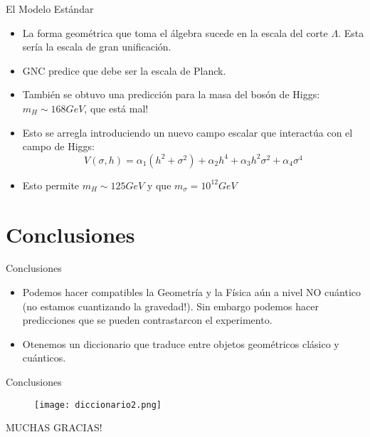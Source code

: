 \documentclass{beamer}
\begin{document}
\begin{frame}{El Modelo Estándar}

\begin{itemize}
\item La forma geométrica que toma el álgebra sucede en la escala del corte $\Lambda$. Esta sería la escala de gran unificación.

\item GNC predice que debe ser la escala de Planck.
\vspace{3mm}
\item También se obtuvo una predicción para la masa del bosón de Higgs: $m_H \sim 168 GeV$, que está mal!
\vspace{3mm}
\item Esto se arregla introduciendo un nuevo campo escalar que interactúa con el campo de Higgs:
\[ V(\sigma , h) = \alpha_1 (h^2 + \sigma^2) + \alpha_2 h^4 + \alpha_3 h^2 \sigma^2 + \alpha_4 \sigma^4
\]
\item Esto permite $m_H \sim 125 GeV$ y que $m_\sigma = 10^12 GeV$
\end{itemize}
\end{frame}


\section{Conclusiones}

\begin{frame}{Conclusiones}

  \begin{itemize}
  \item
    Podemos hacer compatibles la Geometría y la Física aún a nivel NO cuántico (\alert{no estamos cuantizando la gravedad!}). Sin embargo podemos hacer predicciones que se pueden contrastarcon el experimento.
    \vspace{5mm}
  \item
    Otenemos un diccionario que traduce entre objetos geométricos clásico y cuánticos.
   
  \end{itemize}
  
 
\end{frame}

\begin{frame}{Conclusiones}
 \begin{figure}
\texttt{[image: diccionario2.png]}
\end{figure}
\end{frame}

\begin{frame}
MUCHAS GRACIAS!

\end{frame}
\end{document}
